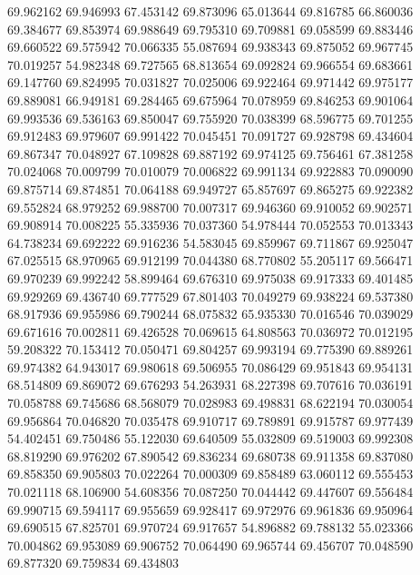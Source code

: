 69.962162
69.946993
67.453142
69.873096
65.013644
69.816785
66.860036
69.384677
69.853974
69.988649
69.795310
69.709881
69.058599
69.883446
69.660522
69.575942
70.066335
55.087694
69.938343
69.875052
69.967745
70.019257
54.982348
69.727565
68.813654
69.092824
69.966554
69.683661
69.147760
69.824995
70.031827
70.025006
69.922464
69.971442
69.975177
69.889081
66.949181
69.284465
69.675964
70.078959
69.846253
69.901064
69.993536
69.536163
69.850047
69.755920
70.038399
68.596775
69.701255
69.912483
69.979607
69.991422
70.045451
70.091727
69.928798
69.434604
69.867347
70.048927
67.109828
69.887192
69.974125
69.756461
67.381258
70.024068
70.009799
70.010079
70.006822
69.991134
69.922883
70.090090
69.875714
69.874851
70.064188
69.949727
65.857697
69.865275
69.922382
69.552824
68.979252
69.988700
70.007317
69.946360
69.910052
69.902571
69.908914
70.008225
55.335936
70.037360
54.978444
70.052553
70.013343
64.738234
69.692222
69.916236
54.583045
69.859967
69.711867
69.925047
67.025515
68.970965
69.912199
70.044380
68.770802
55.205117
69.566471
69.970239
69.992242
58.899464
69.676310
69.975038
69.917333
69.401485
69.929269
69.436740
69.777529
67.801403
70.049279
69.938224
69.537380
68.917936
69.955986
69.790244
68.075832
65.935330
70.016546
70.039029
69.671616
70.002811
69.426528
70.069615
64.808563
70.036972
70.012195
59.208322
70.153412
70.050471
69.804257
69.993194
69.775390
69.889261
69.974382
64.943017
69.980618
69.506955
70.086429
69.951843
69.954131
68.514809
69.869072
69.676293
54.263931
68.227398
69.707616
70.036191
70.058788
69.745686
68.568079
70.028983
69.498831
68.622194
70.030054
69.956864
70.046820
70.035478
69.910717
69.789891
69.915787
69.977439
54.402451
69.750486
55.122030
69.640509
55.032809
69.519003
69.992308
68.819290
69.976202
67.890542
69.836234
69.680738
69.911358
69.837080
69.858350
69.905803
70.022264
70.000309
69.858489
63.060112
69.555453
70.021118
68.106900
54.608356
70.087250
70.044442
69.447607
69.556484
69.990715
69.594117
69.955659
69.928417
69.972976
69.961836
69.950964
69.690515
67.825701
69.970724
69.917657
54.896882
69.788132
55.023366
70.004862
69.953089
69.906752
70.064490
69.965744
69.456707
70.048590
69.877320
69.759834
69.434803
